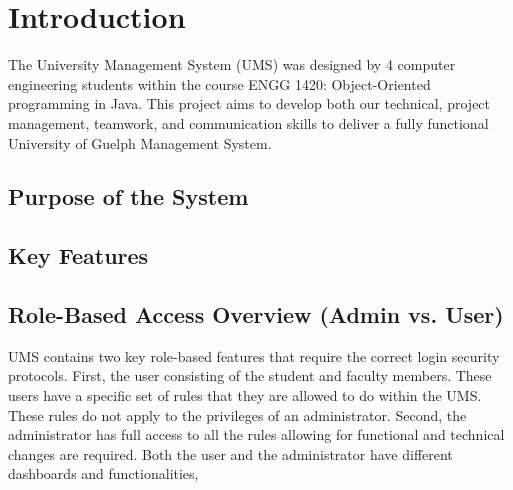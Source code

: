 \newpage
\section{Introduction}

The University Management System (UMS) was designed by 4 computer engineering students within the course ENGG 1420: Object-Oriented programming in Java. This project aims to develop both our technical, project management, teamwork, and communication skills to deliver a fully functional University of Guelph Management System.



\subsection{Purpose of the System}

\subsection{Key Features}

\subsection{Role-Based Access Overview (Admin vs. User)}

UMS contains two key role-based features that require the correct login security protocols. First, the user consisting of the student and faculty members. These users have a specific set of rules that they are allowed to do within the UMS. These rules do not apply to the privileges of an administrator. Second, the administrator has full access to all the rules allowing for functional and technical changes are required. Both the user and the administrator have different dashboards and functionalities,





